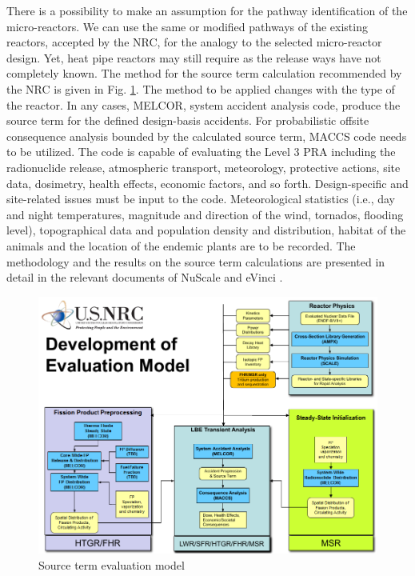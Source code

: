 \documentclass[10pt,a4paper]{article}
\begin{document}
There is a possibility to make an assumption for the pathway identification of the micro-reactors. We can use the same or modified pathways of the existing reactors, accepted by the NRC, for the analogy to the selected micro-reactor design. Yet, heat pipe reactors may still require as the release ways have not completely known.
The method for the source term calculation recommended by the NRC is given in Fig. \ref{sourceterm}. The method to be applied changes with the type of the reactor. In any cases, MELCOR, system accident analysis code, produce the source term for the defined design-basis accidents. 
For probabilistic offsite consequence analysis bounded by the calculated source term, MACCS code needs to be utilized. The code is capable of evaluating the Level 3 PRA including the radionuclide release, atmospheric transport, meteorology, protective actions, site data, dosimetry, health effects, economic factors, and so forth. Design-specific and site-related issues must be input to the code.  Meteorological statistics (i.e., day and night temperatures, magnitude and direction of the wind, tornados, flooding level), topographical data and population density and distribution, habitat of the animals and the location of the endemic plants are to be recorded.   
The methodology and the results on the source term calculations are presented in detail in the relevant documents of NuScale \cite{NuScale18} and eVinci \cite{Southern19}.

\begin{figure}[hbtp]
\centering
\includegraphics[scale=0.6]{Figs/fig7.jpeg}
\caption{Source term evaluation model}
\label{sourceterm}
\end{figure}
\end{document}
